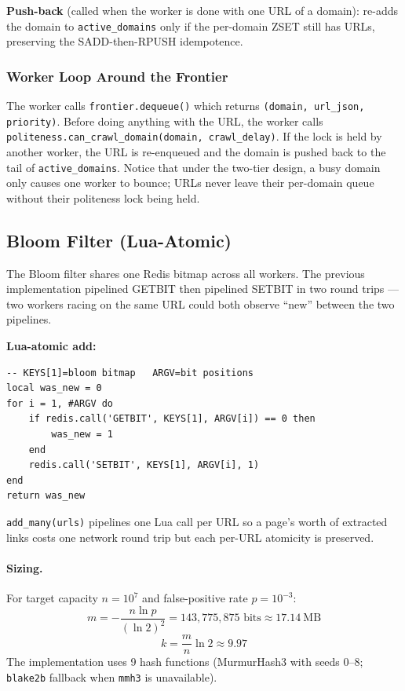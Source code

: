 \documentclass[11pt,a4paper]{article}
\newcommand{\code}[1]{\texttt{#1}}
\begin{document}
\textbf{Push-back} (called when the worker is done with one URL of a domain): re-adds the domain to \code{active\_domains} only if the per-domain ZSET still has URLs, preserving the SADD-then-RPUSH idempotence.

\subsubsection{Worker Loop Around the Frontier}

The worker calls \code{frontier.dequeue()} which returns \code{(domain, url\_json, priority)}. Before doing anything with the URL, the worker calls \code{politeness.can\_crawl\_domain(domain, crawl\_delay)}. If the lock is held by another worker, the URL is re-enqueued and the domain is pushed back to the tail of \code{active\_domains}. Notice that under the two-tier design, a busy domain only causes one worker to bounce; URLs never leave their per-domain queue without their politeness lock being held.

\subsection{Bloom Filter (Lua-Atomic)}
\label{sec:bloom}

The Bloom filter shares one Redis bitmap across all workers. The previous implementation pipelined GETBIT then pipelined SETBIT in two round trips --- two workers racing on the same URL could both observe ``new'' between the two pipelines.

\textbf{Lua-atomic add:}

\begin{lstlisting}
-- KEYS[1]=bloom bitmap   ARGV=bit positions
local was_new = 0
for i = 1, #ARGV do
    if redis.call('GETBIT', KEYS[1], ARGV[i]) == 0 then
        was_new = 1
    end
    redis.call('SETBIT', KEYS[1], ARGV[i], 1)
end
return was_new
\end{lstlisting}

\code{add\_many(urls)} pipelines one Lua call per URL so a page's worth of extracted links costs one network round trip but each per-URL atomicity is preserved.

\paragraph{Sizing.} For target capacity $n=10^7$ and false-positive rate $p=10^{-3}$:
\begin{equation}
m = -\frac{n \ln p}{(\ln 2)^2} = 143{,}775{,}875 \text{ bits} \approx 17.14~\text{MB}
\end{equation}
\begin{equation}
k = \frac{m}{n} \ln 2 \approx 9.97
\end{equation}
The implementation uses 9 hash functions (MurmurHash3 with seeds 0--8; \code{blake2b} fallback when \code{mmh3} is unavailable).
\end{document}
